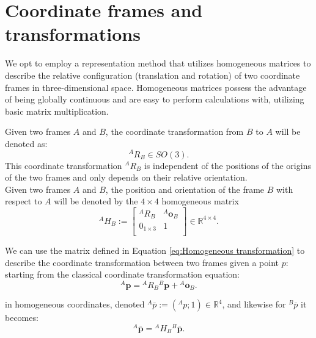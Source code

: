     \section{Coordinate frames and transformations}
    \label{sec:Coordinate frames and transformations}

    We opt to employ a representation method that utilizes homogeneous matrices to describe the relative configuration (translation and rotation) of two coordinate frames in three-dimensional space. Homogeneous matrices possess the advantage of being globally continuous and are easy to perform calculations with, utilizing basic matrix multiplication.
   
    Given two frames $A$ and $B$, the coordinate transformation from $B$ to $A$ will be denoted as:
    \begin{equation}
    {}^{A} {R}_B \in SO(3).
    \end{equation}
    This coordinate transformation ${}^{A} {R}_B$ is independent of the positions of the origins of the two frames and only depends on their relative orientation. \\
    
    Given two frames $A$ and $B$, the position and orientation of the frame $B$ with respect to $A$ will be denoted by the $4 \times 4$ homogeneous matrix
    \begin{equation}
    {}^{A} {H}_B := \begin{bmatrix}
    {}^{A} {R}_B & {{}^{A} \mathbf{o}_B} \\
     {0}_{1 \times 3} & 1 \\
    \end{bmatrix} \in \mathbb{R}^{4 \times 4}.
    \label{eq:Homogeneous transformation}
    \end{equation}

    We can use the matrix defined in Equation \eqref{eq:Homogeneous transformation} to describe the coordinate transformation between two frames given a point $ {p}$:
    starting from the classical coordinate transformation equation:
    \begin{equation}
    {}^{A} \mathbf{p} = {}^{A} {R}_B {}^{B} \mathbf{p} + {{}^{A} \mathbf{o}_B}.
    \label{eq:coordinate transformation}
    \end{equation}

    in homogeneous coordinates, denoted ${}^{A}\bar{ {p}} := ({}^{A} {p};1) \in \mathbb{R}^{4}$, and likewise for ${}^{B}\bar{ {p}}$  it becomes:
    \begin{equation}
    {}^{A}\bar{ \mathbf{p}} = {}^{A} {H}_B {}^{B}\bar{ \mathbf{p}}.
    \label{eq:homogeneous coordinate transformation}
    \end{equation}

